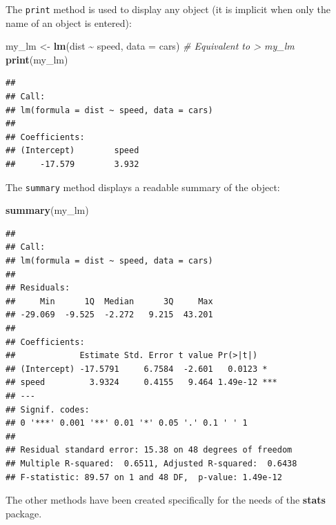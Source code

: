 \documentclass[
  12pt,
  american,
  a4paper,
  extrafontsizes,onecolumn,openright
  ]{memoir}
\newenvironment{Shaded}{\begin{snugshade}}{\end{snugshade}}
\newcommand{\AttributeTok}[1]{\textcolor[rgb]{0.13,0.29,0.53}{#1}}
\newcommand{\CommentTok}[1]{\textcolor[rgb]{0.56,0.35,0.01}{\textit{#1}}}
\newcommand{\FunctionTok}[1]{\textcolor[rgb]{0.13,0.29,0.53}{\textbf{#1}}}
\newcommand{\NormalTok}[1]{#1}
\newcommand{\OtherTok}[1]{\textcolor[rgb]{0.56,0.35,0.01}{#1}}
\newcommand{\SpecialCharTok}[1]{\textcolor[rgb]{0.81,0.36,0.00}{\textbf{#1}}}
\begin{document}
\normalsize

The \texttt{print} method is used to display any object (it is implicit when only the name of an object is entered):

\scriptsize

\begin{Shaded}
\begin{Highlighting}[]
\NormalTok{my\_lm }\OtherTok{\textless{}{-}} \FunctionTok{lm}\NormalTok{(dist }\SpecialCharTok{\textasciitilde{}}\NormalTok{ speed, }\AttributeTok{data =}\NormalTok{ cars)}
\CommentTok{\# Equivalent to \textquotesingle{}\textgreater{} my\_lm\textquotesingle{}}
\FunctionTok{print}\NormalTok{(my\_lm)}
\end{Highlighting}
\end{Shaded}

\begin{verbatim}
## 
## Call:
## lm(formula = dist ~ speed, data = cars)
## 
## Coefficients:
## (Intercept)        speed  
##     -17.579        3.932
\end{verbatim}

\normalsize

The \texttt{summary} method displays a readable summary of the object:

\scriptsize

\begin{Shaded}
\begin{Highlighting}[]
\FunctionTok{summary}\NormalTok{(my\_lm)}
\end{Highlighting}
\end{Shaded}

\begin{verbatim}
## 
## Call:
## lm(formula = dist ~ speed, data = cars)
## 
## Residuals:
##     Min      1Q  Median      3Q     Max 
## -29.069  -9.525  -2.272   9.215  43.201 
## 
## Coefficients:
##             Estimate Std. Error t value Pr(>|t|)    
## (Intercept) -17.5791     6.7584  -2.601   0.0123 *  
## speed         3.9324     0.4155   9.464 1.49e-12 ***
## ---
## Signif. codes:  
## 0 '***' 0.001 '**' 0.01 '*' 0.05 '.' 0.1 ' ' 1
## 
## Residual standard error: 15.38 on 48 degrees of freedom
## Multiple R-squared:  0.6511, Adjusted R-squared:  0.6438 
## F-statistic: 89.57 on 1 and 48 DF,  p-value: 1.49e-12
\end{verbatim}

\normalsize

The other methods have been created specifically for the needs of the \textbf{stats} package.
\end{document}
